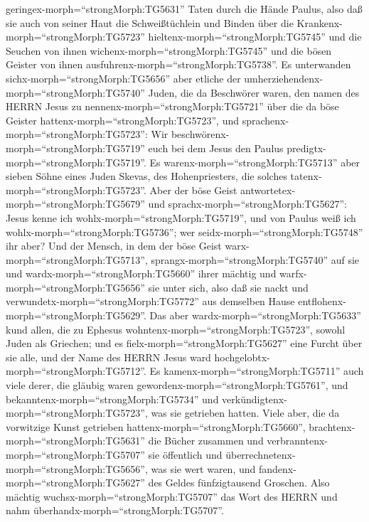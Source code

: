 geringex-morph=``strongMorph:TG5631'' Taten durch die Hände Paulus,
 also daß sie auch von seiner Haut die Schweißtüchlein und
Binden über die Krankenx-morph=``strongMorph:TG5723''
hieltenx-morph=``strongMorph:TG5745'' und die Seuchen von ihnen
wichenx-morph=``strongMorph:TG5745'' und die bösen Geister von ihnen
ausfuhrenx-morph=``strongMorph:TG5738''.  Es unterwanden
sichx-morph=``strongMorph:TG5656'' aber etliche der
umherziehendenx-morph=``strongMorph:TG5740'' Juden, die da Beschwörer
waren, den namen des HERRN Jesus zu nennenx-morph=``strongMorph:TG5721''
über die da böse Geister hattenx-morph=``strongMorph:TG5723'', und
sprachenx-morph=``strongMorph:TG5723'': Wir
beschwörenx-morph=``strongMorph:TG5719'' euch bei dem Jesus den Paulus
predigtx-morph=``strongMorph:TG5719''.  Es
warenx-morph=``strongMorph:TG5713'' aber sieben Söhne eines Juden
Skevas, des Hohenpriesters, die solches
tatenx-morph=``strongMorph:TG5723''.  Aber der böse Geist
antwortetex-morph=``strongMorph:TG5679'' und
sprachx-morph=``strongMorph:TG5627'': Jesus kenne ich
wohlx-morph=``strongMorph:TG5719'', und von Paulus weiß ich
wohlx-morph=``strongMorph:TG5736''; wer
seidx-morph=``strongMorph:TG5748'' ihr aber?  Und der
Mensch, in dem der böse Geist warx-morph=``strongMorph:TG5713'',
sprangx-morph=``strongMorph:TG5740'' auf sie und
wardx-morph=``strongMorph:TG5660'' ihrer mächtig und
warfx-morph=``strongMorph:TG5656'' sie unter sich, also daß sie nackt
und verwundetx-morph=``strongMorph:TG5772'' aus demselben Hause
entflohenx-morph=``strongMorph:TG5629''.  Das aber
wardx-morph=``strongMorph:TG5633'' kund allen, die zu Ephesus
wohntenx-morph=``strongMorph:TG5723'', sowohl Juden als Griechen; und es
fielx-morph=``strongMorph:TG5627'' eine Furcht über sie alle, und der
Name des HERRN Jesus ward hochgelobtx-morph=``strongMorph:TG5712''.
 Es kamenx-morph=``strongMorph:TG5711'' auch viele derer,
die gläubig waren gewordenx-morph=``strongMorph:TG5761'', und
bekanntenx-morph=``strongMorph:TG5734'' und
verkündigtenx-morph=``strongMorph:TG5723'', was sie getrieben hatten.
 Viele aber, die da vorwitzige Kunst getrieben
hattenx-morph=``strongMorph:TG5660'',
brachtenx-morph=``strongMorph:TG5631'' die Bücher zusammen und
verbranntenx-morph=``strongMorph:TG5707'' sie öffentlich und
überrechnetenx-morph=``strongMorph:TG5656'', was sie wert waren, und
fandenx-morph=``strongMorph:TG5627'' des Geldes fünfzigtausend Groschen.
 Also mächtig wuchsx-morph=``strongMorph:TG5707'' das Wort
des HERRN und nahm überhandx-morph=``strongMorph:TG5707''. 
